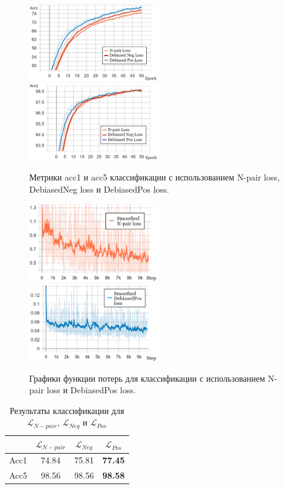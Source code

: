 \documentclass[a4paper, 14pt]{article}
\begin{document}
\begin{figure}[!ht]
   \includegraphics[width=0.5\textwidth]{Pictures/loss_acc1_new.png}
   \hfill
   \includegraphics[width=0.5\textwidth]
   {Pictures/loss_acc5_new.png}
   \caption{Метрики acc1 и acc5 классификации с использованием N-pair loss, DebiasedNeg loss и DebiasedPos loss.}
   \label{fg:acc}
\end{figure}

\begin{figure}[!ht]
   \includegraphics[width=0.5\textwidth]{Pictures/N-pair_loss.png}
   \hfill
   \includegraphics[width=0.5\textwidth]{Pictures/DebiasedPos_loss.png}
   \caption{Графики функции потерь для классификации с использованием N-pair loss и DebiasedPos loss.}
   \label{fg:acc}
\end{figure}

\begin{table}[!ht]
\begin{center}
\caption{Результаты классификации для $\mathcal{L}_{N-pair}$, $\mathcal{L}_{Neg}$ и $\mathcal{L}_{Pos}$}
\begin{tabular}{| c | c | c | c |}
\hline
& $\mathcal{L}_{N-pair}$ & $\mathcal{L}_{Neg}$ & $\mathcal{L}_{Pos}$ \\ \hline
Acc1 & 74.84 & 75.81 & \textbf{77.45}\\ \hline
Acc5 & 98.56 & 98.56 & \textbf{98.58}\\ \hline
\end{tabular}
\label{res_classification}
\end{center}
\end{table}
\end{document}
